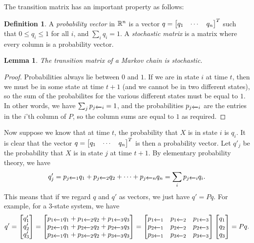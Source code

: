 \documentclass[reqno]{amsart}
\newtheorem{lemma}[theorem]{Lemma}
\theoremstyle{definition}
\newtheorem{definition}[theorem]{Definition}
\newcommand{\dfn}[1]{\emph{{#1}}\index{#1}}
\begin{document}
The transition matrix has an important property as follows:
\begin{definition}\label{defn-stochastic}
 A \dfn{probability vector} in ${\mathbb{R}}^n$ is a vector
 $q=\left[\begin{matrix} q_1 & \cdots & q_n\end{matrix}\right]^T$ such that $0\leq q_i\leq 1$ for all
 $i$, and $\sum_iq_i=1$.  A \emph{stochastic matrix} is a matrix where
 every column is a probability vector.
\end{definition}

\begin{lemma}\label{lem-markov-stochastic}
 The transition matrix of a Markov chain is stochastic.
\end{lemma}
\begin{proof}
 Probabilities always lie between $0$ and $1$.  If we are in state $i$
 at time $t$, then we must be in some state at time $t+1$ (and we
 cannot be in two different states), so the sum of the probabilites for
 the various different states must be equal to $1$.  In other words,
 we have $\sum_jp_{j\xleftarrow{}i}=1$, and the probabilities $p_{j\xleftarrow{}i}$
 are the entries in the $i$'th column of $P$, so the column sums are
 equal to $1$ as required.
\end{proof}

Now suppose we know that at time $t$, the probability that $X$ is in
state $i$ is $q_i$.  It is clear that the vector
$q=\left[\begin{matrix} q_1 & \cdots & q_n\end{matrix}\right]^T$ is then a probability vector.
Let $q'_j$ be the probability that $X$ is in state $j$ at time $t+1$.
By elementary probability theory, we have
\[ q'_j = p_{j\xleftarrow{}1} q_1 +
          p_{j\xleftarrow{}2} q_2 + \dotsb +
          p_{j\xleftarrow{}n} q_n
        = \sum_i p_{j\xleftarrow{}i} q_i.
\]
This means that if we regard $q$ and $q'$ as vectors, we just have
$q'=Pq$.  For example, for a $3$-state system, we have
\[ q'
   = \left[\begin{matrix} q'_1\\ q'_2 \\ q'_3 \end{matrix}\right]
   = \left[\begin{matrix}
      p_{1\xleftarrow{}1} q_1 +  p_{1\xleftarrow{}2} q_2 +  p_{1\xleftarrow{}3} q_3 \\
      p_{2\xleftarrow{}1} q_1 +  p_{2\xleftarrow{}2} q_2 +  p_{2\xleftarrow{}3} q_3 \\
      p_{3\xleftarrow{}1} q_1 +  p_{3\xleftarrow{}2} q_2 +  p_{3\xleftarrow{}3} q_3
     \end{matrix}\right]
   = \left[\begin{matrix}
      p_{1\xleftarrow{}1} & p_{1\xleftarrow{}2} & p_{1\xleftarrow{}3} \\
      p_{2\xleftarrow{}1} & p_{2\xleftarrow{}2} & p_{2\xleftarrow{}3} \\
      p_{3\xleftarrow{}1} & p_{3\xleftarrow{}2} & p_{3\xleftarrow{}3}
     \end{matrix}\right]
     \left[\begin{matrix} q_1 \\ q_2 \\ q_3 \end{matrix}\right]
   = Pq.
\]
\end{document}
